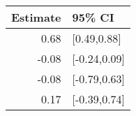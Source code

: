 \begin{tabular}{rl}
  \hline
Estimate & 95\% CI \\ 
  \hline
0.68 & [0.49,0.88] \\ 
  -0.08 & [-0.24,0.09] \\ 
  -0.08 & [-0.79,0.63] \\ 
  0.17 & [-0.39,0.74] \\ 
   \hline
\end{tabular}

